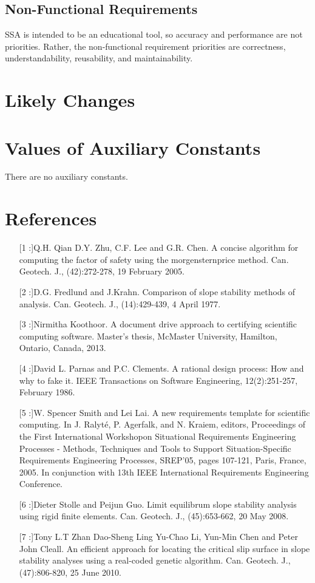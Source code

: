\documentclass[12pt]{article}
\begin{document}
\subsection{Non-Functional Requirements}
\label{Sec:Non-Requ}
SSA is intended to be an educational tool, so accuracy and performance are not priorities. Rather, the non-functional requirement priorities are correctness, understandability, reusability, and maintainability.
\section{Likely Changes}
\label{Sec:LikeChan}
\section{Values of Auxiliary Constants}
\label{Sec:ValuofAuxiCons}
There are no auxiliary constants.
\section{References}
\label{Sec:Refe}
\begin{itemize}
\item[[1]:]Q.H. Qian D.Y. Zhu, C.F. Lee and G.R. Chen. A concise algorithm for computing the factor of safety using the morgensternprice method. Can. Geotech. J., (42):272-278, 19 February 2005.
\item[[2]:]D.G. Fredlund and J.Krahn. Comparison of slope stability methods of analysis. Can. Geotech. J., (14):429-439, 4 April 1977.
\item[[3]:]Nirmitha Koothoor. A document drive approach to certifying scientific computing software. Master's thesis, McMaster University, Hamilton, Ontario, Canada, 2013.
\item[[4]:]David L. Parnas and P.C. Clements. A rational design process: How and why to fake it. IEEE Transactions on Software Engineering, 12(2):251-257, February 1986.
\item[[5]:]W. Spencer Smith and Lei Lai. A new requirements template for scientific computing. In J. Ralyt\'{e}, P. Agerfalk, and N. Kraiem, editors, Proceedings of the First International Workshopon Situational Requirements Engineering Processes - Methods, Techniques and Tools to Support Situation-Specific Requirements Engineering Processes, SREP'05, pages 107-121, Paris, France, 2005. In conjunction with 13th IEEE International Requirements Engineering Conference.
\item[[6]:]Dieter Stolle and Peijun Guo. Limit equilibrum slope stability analysis using rigid finite elements. Can. Geotech. J., (45):653-662, 20 May 2008.
\item[[7]:]Tony L.T Zhan Dao-Sheng Ling Yu-Chao Li, Yun-Min Chen and Peter John Cleall. An efficient approach for locating the critical slip surface in slope stability analyses using a real-coded genetic algorithm. Can. Geotech. J., (47):806-820, 25 June 2010.
\end{itemize}
\end{document}
